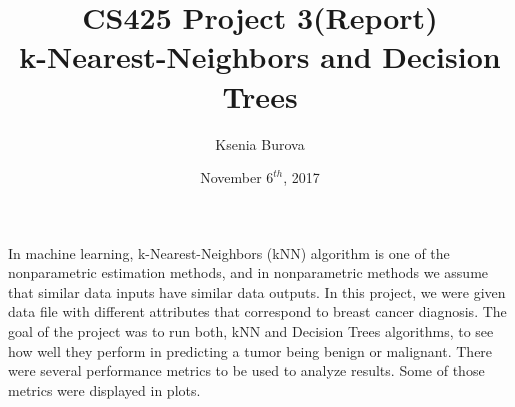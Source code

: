 \documentclass[12pt, letterpaper]{article}
\title{CS425 Project 3(Report)\\k-Nearest-Neighbors and Decision Trees}
\author{Ksenia Burova}
\date{November \(6^{th}\), 2017}
\begin{document}
\maketitle

{ In machine learning, k-Nearest-Neighbors (kNN) algorithm is one of the nonparametric estimation methods, and in nonparametric methods we assume that similar data inputs have similar data outputs. In this project, we were given data file with different attributes that correspond to breast cancer diagnosis. The goal of the project was to run both, kNN and Decision Trees algorithms, to see how well they perform in predicting a tumor being benign or malignant. There were several performance metrics to be used to analyze results. Some of those metrics were displayed in plots. \\}
\end{document}
